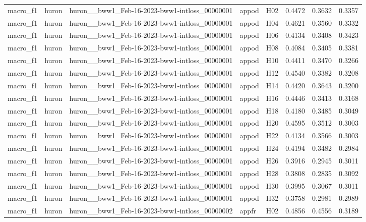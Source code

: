 \begin{table}[tbp]
\begin{tabular}{lllllrrr}
macro\_f1 & huron & huron\_\_bww1\_Feb-16-2023-bww1-intloss\_00000001 & appod & H02 & 0.4472 & 0.3632 & 0.3357 \\
macro\_f1 & huron & huron\_\_bww1\_Feb-16-2023-bww1-intloss\_00000001 & appod & H04 & 0.4621 & 0.3560 & 0.3332 \\
macro\_f1 & huron & huron\_\_bww1\_Feb-16-2023-bww1-intloss\_00000001 & appod & H06 & 0.4134 & 0.3408 & 0.3423 \\
macro\_f1 & huron & huron\_\_bww1\_Feb-16-2023-bww1-intloss\_00000001 & appod & H08 & 0.4084 & 0.3405 & 0.3381 \\
macro\_f1 & huron & huron\_\_bww1\_Feb-16-2023-bww1-intloss\_00000001 & appod & H10 & 0.4411 & 0.3470 & 0.3266 \\
macro\_f1 & huron & huron\_\_bww1\_Feb-16-2023-bww1-intloss\_00000001 & appod & H12 & 0.4540 & 0.3382 & 0.3208 \\
macro\_f1 & huron & huron\_\_bww1\_Feb-16-2023-bww1-intloss\_00000001 & appod & H14 & 0.4420 & 0.3643 & 0.3200 \\
macro\_f1 & huron & huron\_\_bww1\_Feb-16-2023-bww1-intloss\_00000001 & appod & H16 & 0.4446 & 0.3413 & 0.3168 \\
macro\_f1 & huron & huron\_\_bww1\_Feb-16-2023-bww1-intloss\_00000001 & appod & H18 & 0.4180 & 0.3485 & 0.3049 \\
macro\_f1 & huron & huron\_\_bww1\_Feb-16-2023-bww1-intloss\_00000001 & appod & H20 & 0.4595 & 0.3512 & 0.3003 \\
macro\_f1 & huron & huron\_\_bww1\_Feb-16-2023-bww1-intloss\_00000001 & appod & H22 & 0.4134 & 0.3566 & 0.3003 \\
macro\_f1 & huron & huron\_\_bww1\_Feb-16-2023-bww1-intloss\_00000001 & appod & H24 & 0.4194 & 0.3482 & 0.2984 \\
macro\_f1 & huron & huron\_\_bww1\_Feb-16-2023-bww1-intloss\_00000001 & appod & H26 & 0.3916 & 0.2945 & 0.3011 \\
macro\_f1 & huron & huron\_\_bww1\_Feb-16-2023-bww1-intloss\_00000001 & appod & H28 & 0.3808 & 0.2835 & 0.3092 \\
macro\_f1 & huron & huron\_\_bww1\_Feb-16-2023-bww1-intloss\_00000001 & appod & H30 & 0.3995 & 0.3067 & 0.3011 \\
macro\_f1 & huron & huron\_\_bww1\_Feb-16-2023-bww1-intloss\_00000001 & appod & H32 & 0.3758 & 0.2981 & 0.2989 \\
macro\_f1 & huron & huron\_\_bww1\_Feb-16-2023-bww1-intloss\_00000002 & appfr & H02 & 0.4856 & 0.4556 & 0.3189 \\

\end{tabular}
\end{table}
